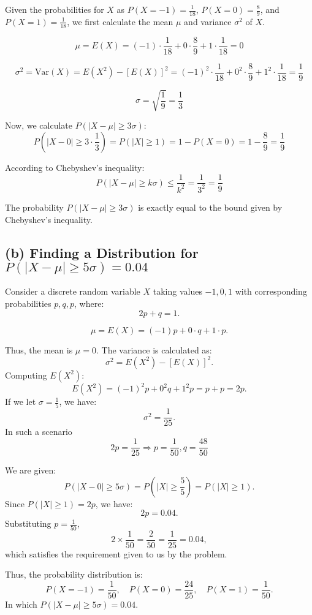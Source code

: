 \documentclass{article}
\begin{document}
Given the probabilities for \(X\) as \(P(X = -1) = \frac{1}{18}\), \(P(X = 0) = \frac{8}{9}\), and \(P(X = 1) = \frac{1}{18}\), we first calculate the mean \(\mu\) and variance \(\sigma^2\) of \(X\).

\[
\mu = E(X) = (-1) \cdot \frac{1}{18} + 0 \cdot \frac{8}{9} + 1 \cdot \frac{1}{18} = 0
\]

\[
\sigma^2 = \text{Var}(X) = E(X^2) - [E(X)]^2 = (-1)^2 \cdot \frac{1}{18} + 0^2 \cdot \frac{8}{9} + 1^2 \cdot \frac{1}{18} = \frac{1}{9}
\]

\[
\sigma = \sqrt{\frac{1}{9}} = \frac{1}{3}
\]

Now, we calculate \(P(|X - \mu| \geq 3\sigma)\):
\[
P(|X - 0| \geq 3 \cdot \frac{1}{3}) = P(|X| \geq 1) = 1 - P(X = 0) = 1 - \frac{8}{9} = \frac{1}{9}
\]

According to Chebyshev's inequality:
\[
P(|X - \mu| \geq k\sigma) \leq \frac{1}{k^2} = \frac{1}{3^2} = \frac{1}{9}
\]

The probability \(P(|X - \mu| \geq 3\sigma)\) is exactly equal to the bound given by Chebyshev's inequality.

\subsection*{(b) Finding a Distribution for \(P(|X - \mu| \geq 5\sigma) = 0.04\)}

Consider a discrete random variable \(X\) taking values \(-1, 0, 1\) with corresponding probabilities \(p, q, p\), where:
\[
2p + q = 1.
\]


\[
\mu = E(X) = (-1) p + 0 \cdot q + 1 \cdot p.
\]

Thus, the mean is \( \mu = 0 \).
The variance is calculated as:
\[
\sigma^2 = E(X^2) - [E(X)]^2.
\]
Computing \(E(X^2)\):
\[
E(X^2) = (-1)^2 p + 0^2 q + 1^2 p = p + p = 2p.
\]
If we let  \( \sigma = \frac{1}{5} \), we have:
\[
\sigma^2 = \frac{1}{25}.
\]
In such a scenario
\[
2p = \frac{1}{25} \Rightarrow p = \frac{1}{50}, q= \frac{48}{50}
\]

We are given:
\[
P(|X - 0| \geq 5\sigma) = P(|X| \geq \frac{5}{5}) = P(|X| \geq 1).
\]
Since \( P(|X| \geq 1) = 2p \), we have:
\[
2p = 0.04.
\]
Substituting \( p = \frac{1}{50} \),
\[
2 \times \frac{1}{50} = \frac{2}{50} = \frac{1}{25} = 0.04,
\]
which satisfies the requirement given to us by the problem.


Thus, the probability distribution is:
\[
P(X = -1) = \frac{1}{50}, \quad P(X = 0) = \frac{24}{25}, \quad P(X = 1) = \frac{1}{50}.
\]
In which  \(P(|X - \mu| \geq 5\sigma) = 0.04\).
\end{document}
